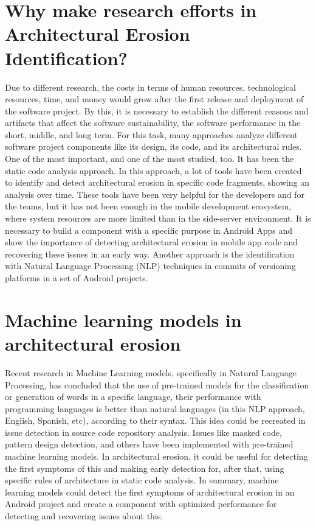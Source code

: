 \section{Why make research efforts in Architectural Erosion Identification?}
Due to different research, the costs in terms of human resources, technological resources, time, and money would grow after the first release and deployment of the software project. By this, it is necessary to establish the different reasons and artifacts that affect the software sustainability, the software performance in the short, middle, and long term. For this task, many approaches analyze different software project components like its design, its code, and its architectural rules. One of the most important, and one of the most studied, too. It has been the static code analysis approach. In this approach, a lot of tools have been created to identify and detect architectural erosion in specific code fragments, showing an analysis over time. These tools have been very helpful for the developers and for the teams, but it has not been enough in the mobile development ecosystem, where system resources are more limited than in the side-server environment. It is necessary to build a component with a specific purpose in Android Apps and show the importance of detecting architectural erosion in mobile app code and recovering these issues in an early way. Another approach is the identification with Natural Language Processing (NLP) techniques in commits of versioning platforms in a set of Android projects.

\section{Machine learning models in architectural erosion}
Recent research in Machine Learning models, specifically in Natural Language Processing, has concluded that the use of pre-trained models for the classification or generation of words in a specific language, their performance with programming languages is better than natural languages (in this NLP approach, English, Spanish, etc), according to their syntax. This idea could be recreated in issue detection in source code repository analysis. Issues like masked code, pattern design detection, and others have been implemented with pre-trained machine learning models. In architectural erosion, it could be useful for detecting the first symptoms of this and making early detection for, after that, using specific rules of architecture in static code analysis. In summary,  machine learning models could detect the first symptoms of architectural erosion in an Android project and create a component with optimized performance for detecting and recovering issues about this.

